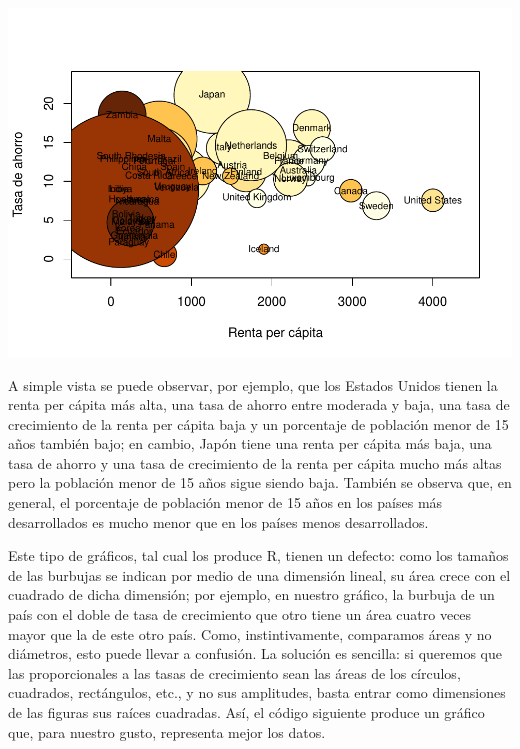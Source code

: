 \documentclass[
]{book}
\newenvironment{Shaded}{\begin{snugshade}}{\end{snugshade}}
\newcommand{\DataTypeTok}[1]{\textcolor[rgb]{0.13,0.29,0.53}{#1}}
\newcommand{\FloatTok}[1]{\textcolor[rgb]{0.00,0.00,0.81}{#1}}
\newcommand{\KeywordTok}[1]{\textcolor[rgb]{0.13,0.29,0.53}{\textbf{#1}}}
\newcommand{\NormalTok}[1]{#1}
\newcommand{\OperatorTok}[1]{\textcolor[rgb]{0.81,0.36,0.00}{\textbf{#1}}}
\newcommand{\StringTok}[1]{\textcolor[rgb]{0.31,0.60,0.02}{#1}}
\theoremstyle{definition}
\theoremstyle{definition}
\theoremstyle{definition}
\theoremstyle{remark}
\begin{document}
\begin{Shaded}
\end{Shaded}

\begin{center}\includegraphics[width=0.9\linewidth]{14cap13_EDextra_files/figure-latex/unnamed-chunk-35-1} \end{center}

A simple vista se puede observar, por ejemplo, que los Estados Unidos tienen la renta per cápita más alta, una tasa de ahorro entre moderada y baja, una tasa de crecimiento de la renta per cápita baja y un porcentaje de población menor de 15 años también bajo; en cambio, Japón tiene una renta per cápita más baja, una tasa de ahorro y una tasa de crecimiento de la renta per cápita mucho más altas pero la población menor de 15 años sigue siendo baja. También se observa que, en general, el porcentaje de población menor de 15 años en los países más desarrollados es mucho menor que en los países menos desarrollados.

Este tipo de gráficos, tal cual los produce R, tienen un defecto: como los tamaños de las burbujas se indican por medio de una dimensión lineal, su área crece con el cuadrado de dicha dimensión; por ejemplo, en nuestro gráfico, la burbuja de un país con el doble de tasa de crecimiento que otro tiene un área cuatro veces mayor que la de este otro país. Como, instintivamente, comparamos áreas y no diámetros,
esto puede llevar a confusión. La solución es sencilla: si queremos que las proporcionales a las tasas de crecimiento sean las áreas de los círculos, cuadrados, rectángulos, etc., y no sus amplitudes,
basta entrar como dimensiones de las figuras sus raíces cuadradas. Así, el código siguiente produce un gráfico que, para nuestro gusto, representa mejor los datos.
\end{document}

